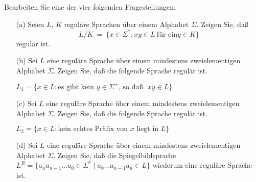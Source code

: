 \begin{exercise}

Bearbeiten Sie eine der vier folgenden Fragestellungen:

\begin{enumerate}
\item [(a)]
Seien $L$, $K$  regul\"are Sprachen \"uber einem Alphabet $\Sigma$.
Zeigen Sie, da{\ss}
$$L/K \ = \ \{ x \in \Sigma^* : xy \in L \ \mbox{f\"ur ein
$y \in K$} \}$$ 
regul\"ar ist.

\item [(b)]
Sei $L$ eine regul\"are Sprache \"uber einem mindestens
zweielementigen Alphabet $\Sigma$.
Zeigen Sie, da{\ss} die folgende Sprache regul\"ar ist.

$L_1 =  \{ x \in L : \mbox{es gibt kein $y \in \Sigma^+$,
so da{\ss} $xy \in L$} \}$

\item [(c)]
Sei $L$ eine regul\"are Sprache \"uber einem mindestens
zweielementigen Alphabet $\Sigma$.
Zeigen Sie, da{\ss} die folgende Sprache regul\"ar ist.

$L_2 = \{ x \in L : \mbox{kein echtes Pr\"afix von $x$ liegt in $L$}
\}$

\item [(d)] Sei $L$ eine regul\"are Sprache \"uber einem mindestens
zweielementigen Alphabet $\Sigma$. Zeigen Sie, da{\ss} die Spiegelbildsprache 
$L^R = \{a_n a_{n-1} \ldots a_0 \in\Sigma^* \mid a_0 \ldots a_{n-1} a_n \in L\}$ 
wiederum eine reguläre Sprache ist. 

\end{enumerate}
\end{exercise}

